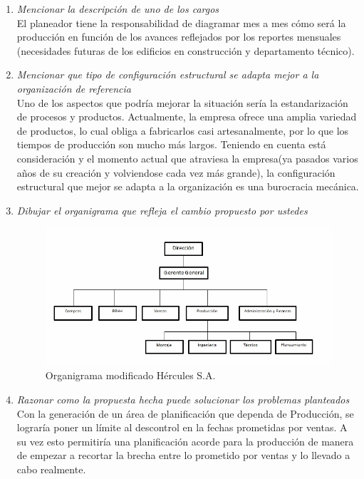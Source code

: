 \documentclass[a4paper,10pt]{article}
\begin{document}
\begin{enumerate}
			\item \textit{Mencionar la descripción de uno de los cargos}\\
			El planeador tiene la responsabilidad de diagramar mes a mes cómo será la producción en función de los avances reflejados por los reportes mensuales (necesidades futuras de los edificios en construcción y departamento técnico).
						
			\item \textit{Mencionar que tipo de configuración estructural se adapta mejor a la organización de referencia}\\
			Uno de los aspectos que podría mejorar la situación sería la estandarización de procesos y productos. Actualmente, la empresa ofrece una amplia variedad de productos, lo cual obliga a fabricarlos casi artesanalmente, por lo que los tiempos de producción son mucho más largos.
			Teniendo en cuenta está consideración y el momento actual que atraviesa la empresa(ya pasados varios años de su creación y volviendose cada vez más grande), la configuración estructural que mejor se adapta a la organización es una burocracia mecánica.
						
			\item \textit{Dibujar el organigrama que refleja el cambio propuesto por ustedes}\\
							\begin{figure}[H]
					\centering
					\includegraphics[scale=0.6]{imagenes/FinalHercules.jpg}
					\caption{Organigrama modificado Hércules S.A.}
				\end{figure}
						
			\item \textit{Razonar como la propuesta hecha puede solucionar los problemas planteados}\\

Con la generación de un área de planificación que dependa de Producción, se lograría poner un límite al descontrol en la fechas prometidas por ventas. A su vez esto permitiría una planificación acorde para la producción de manera de empezar a recortar la brecha entre lo prometido por ventas y lo llevado a cabo realmente.\\


\end{enumerate}
\end{document}
